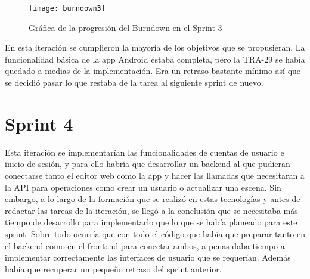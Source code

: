 \begin{table}[H]
\label{TRA-30}
\end{table}

\begin{figure}[h]
    \centering
    \texttt{[image: burndown3]}
    \caption[Burndown Sprint 3]{Gráfica de la progresión del Burndown en el Sprint 3}
\end{figure}

En esta iteración se cumplieron la mayoría de los objetivos que se propusieran. La funcionalidad básica de la app Android estaba completa, pero la TRA-29 se había quedado a medias de la implementación. Era un retraso bastante mínimo así que se decidió pasar lo que restaba de la tarea al siguiente sprint de nuevo.

\section{Sprint 4}

Esta iteración se implementarían las funcionalidades de cuentas de usuario e inicio de sesión, y para ello habría que desarrollar un backend al que pudieran conectarse tanto el editor web como la app y hacer las llamadas que necesitaran a la API para operaciones como crear un usuario o actualizar una escena. Sin embargo, a lo largo de la formación que se realizó en estas tecnologías y antes de redactar las tareas de la iteración, se llegó a la conclusión que se necesitaba más tiempo de desarrollo para implementarlo que lo que se había planeado para este sprint. Sobre todo ocurría que con todo el código que había que preparar tanto en el backend como en el frontend para conectar ambos, a penas daba tiempo a implementar correctamente las interfaces de usuario que se requerían. Además había que recuperar un pequeño retraso del sprint anterior.

